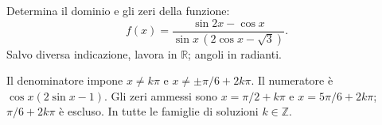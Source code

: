 
\begin{esercizio}
Determina il dominio e gli zeri della funzione: 
\[
f(x)=\dfrac{\sin 2x-\cos x}{\sin x\,(2\cos x-\sqrt{3})}.
\]
Salvo diversa indicazione, lavora in $\mathbb R$; angoli in radianti.
\end{esercizio}

\begin{soluzione}
Il denominatore impone $x\ne k\pi$ e $x\ne\pm\pi/6+2k\pi$.
Il numeratore è $\cos x(2\sin x-1)$.
Gli zeri ammessi sono $x=\pi/2+k\pi$ e $x=5\pi/6+2k\pi$;
$\pi/6+2k\pi$ è escluso. In tutte le famiglie di soluzioni $k\in\mathbb{Z}$.
\end{soluzione}
